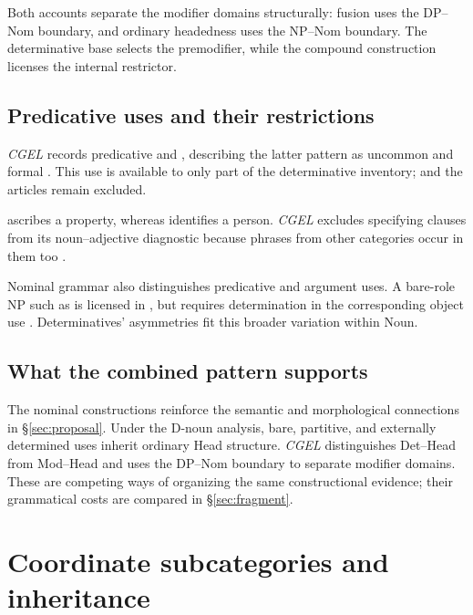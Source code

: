 \documentclass[12pt]{article}
\begin{document}
Both accounts separate the modifier domains structurally: fusion uses the DP--Nom boundary, and ordinary headedness uses the NP--Nom boundary. The determinative base selects the premodifier, while the compound construction licenses the internal restrictor.

\subsection{Predicative uses and their restrictions}\label{sec:predication}

\textit{CGEL} records predicative  and , describing the latter pattern as uncommon and formal \citep[392, 395--396]{huddleston2002}. This use is available to only part of the determinative inventory;  and the articles remain excluded.

 ascribes a property, whereas  identifies a person. \textit{CGEL} excludes specifying  clauses from its noun--adjective diagnostic because phrases from other categories occur in them too \citep[536]{huddleston2002}.

Nominal grammar also distinguishes predicative and argument uses. A bare-role NP such as  is licensed in , but requires determination in the corresponding object use  \citep[328]{huddleston2002}. Determinatives' asymmetries fit this broader variation within Noun.

\subsection{What the combined pattern supports}\label{sec:cumulative}

The nominal constructions reinforce the semantic and morphological connections in §\ref{sec:proposal}. Under the D-noun analysis, bare, partitive, and externally determined uses inherit ordinary Head structure. \textit{CGEL} distinguishes Det--Head from Mod--Head and uses the DP--Nom boundary to separate modifier domains. These are competing ways of organizing the same constructional evidence; their grammatical costs are compared in §\ref{sec:fragment}.

\section{Coordinate subcategories and inheritance}\label{sec:inheritance}
\end{document}
